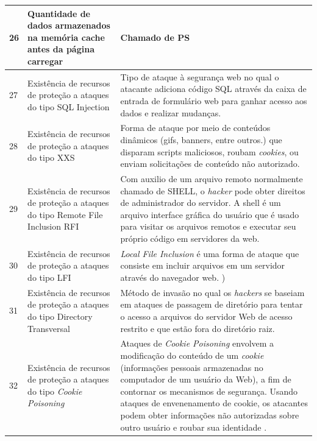 \begin{apendicesenv}
\begin{landscape}
\begin{longtable}{|p{10pt}|p{220pt}|p{415pt}|}
 	 {\raggedright {26}}
 	  	 	 	 	 & {\raggedright {Quantidade de dados armazenados na memória cache antes da página carregar}}
 	  	 	 	 	 & {\raggedright {Chamado de PS \cite{patel}}}\\
 	  	 	 	 	\hline
 	 {\raggedright {27}}
 	  	 	 	 	 & {\raggedright {Existência de recursos de proteção a ataques do tipo SQL Injection}}
 	  	 	 	 	 & {\raggedright {Tipo de ataque à segurança web no qual o atacante adiciona código SQL através da caixa de entrada de formulário web para ganhar acesso aos dados e realizar mudanças. \cite{Patel2013}}}\\
 	  	 	 	 	\hline
 	 {\raggedright {28}}
 	  	 	 	 	 & {\raggedright {Existência de recursos de proteção a ataques do tipo XXS}}
 	  	 	 	 	 & {\raggedright {Forma de ataque por meio de conteúdos dinâmicos (gifs, banners, entre outros.) que disparam scripts maliciosos, roubam \textit{cookies}, ou enviam solicitações de conteúdo não autorizado.\cite{Patel2013}}}\\
 	  	 	 	 	\hline
 	  	 	 	 	{\raggedright {29}}
 	  	 	 	 	 & {\raggedright {Existência de recursos de proteção a ataques do tipo Remote File Inclusion RFI}}
 	  	 	 	 & {\raggedright {Com auxilio de um arquivo remoto normalmente chamado de SHELL, o \textit{hacker}  pode obter
 	  	 	 	 direitos de administrador do servidor. A shell é um arquivo interface gráfica do usuário
 	  	 	 	  que é usado para visitar os arquivos remotos e executar
 	  seu próprio código em servidores da web.\cite{Patel2013} }}\\
 	  	 	 	 	 	 	 	 	\hline 
 	 {\raggedright {30}}
 	  	 	 	 	 & {\raggedright {Existência de recursos de proteção a ataques do tipo LFI}}
 	  	 	 	 	 & {\raggedright {\textit{Local File Inclusion} é uma forma de ataque que consiste em  incluir arquivos em um servidor através do navegador web. \cite{Patel2013})}}\\
 	  	 	 	 	\hline
{\raggedright {31}}
 	 	 & {\raggedright {Existência de recursos de proteção a ataques do tipo Directory Transversal}}
 	 	 & {\raggedright {Método de invasão no qual os \textit{hackers} se baseiam em ataques de passagem de diretório para tentar o acesso a arquivos do servidor Web de acesso restrito e que estão fora do diretório raiz. \cite{Patel2013} }}\\
 	 	\hline
 	{\raggedright {32}}
 	 	 & {\raggedright {Existência de recursos de proteção a ataques do tipo  \textit{Cookie Poisoning}}}
 	 	 & {\raggedright {Ataques de \textit{Cookie Poisoning}  envolvem a modificação do conteúdo de um \textit{cookie} (informações pessoais armazenadas no computador de um usuário da Web), a fim de contornar os mecanismos de segurança. Usando ataques de envenenamento de cookie, os atacantes podem obter informações não autorizadas sobre outro usuário e roubar sua identidade \cite{Imperva}.}}\\

\end{longtable}
\end{landscape}
\end{apendicesenv}
